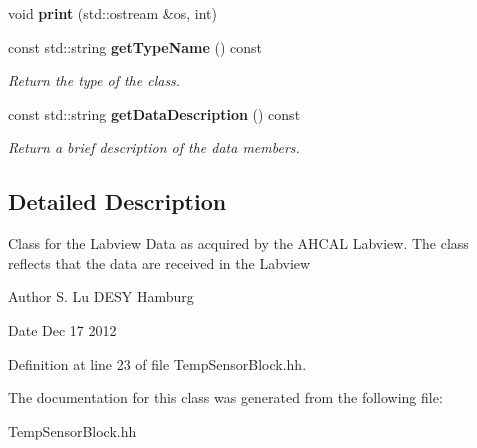 \begin{DoxyCompactItemize}
\item 
void {\bfseries print} (std::ostream \&os, int)\label{classCALICE_1_1TempSensorBlock_af1650378e195b324cfddfa3c2feb9ce6}

\item 
const std::string {\bf getTypeName} () const \label{classCALICE_1_1TempSensorBlock_a00a31b0c70354ed04a4bddc7d62772f3}

\begin{DoxyCompactList}\small\item\em Return the type of the class. \item\end{DoxyCompactList}\item 
const std::string {\bf getDataDescription} () const \label{classCALICE_1_1TempSensorBlock_ab9a8cfa10c171003da2614fb4518b566}

\begin{DoxyCompactList}\small\item\em Return a brief description of the data members. \item\end{DoxyCompactList}\end{DoxyCompactItemize}


\subsection{Detailed Description}
Class for the Labview Data as acquired by the AHCAL Labview. The class reflects that the data are received in the Labview \begin{DoxyAuthor}{Author}
S. Lu DESY Hamburg 
\end{DoxyAuthor}
\begin{DoxyDate}{Date}
Dec 17 2012 
\end{DoxyDate}


Definition at line 23 of file TempSensorBlock.hh.

The documentation for this class was generated from the following file:\begin{DoxyCompactItemize}
\item 
TempSensorBlock.hh\end{DoxyCompactItemize}
